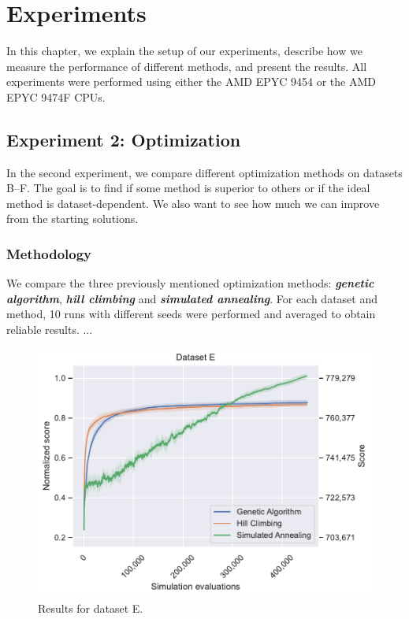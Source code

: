 \chapter{Experiments} \label{chap:experiments}

In this chapter, we explain the setup of our experiments, describe how we measure the performance of different methods, and present the results. All experiments were performed using either the AMD EPYC 9454 or the AMD EPYC 9474F CPUs.

\section{Experiment 2: Optimization}

In the second experiment, we compare different optimization methods on datasets B--F. The goal is to find if some method is superior to others or if the ideal method is dataset-dependent. We also want to see how much we can improve from the starting solutions.

\subsection*{Methodology}

We compare the three previously mentioned optimization methods: \textit{\textbf{genetic algorithm}}, \textit{\textbf{hill climbing}} and \textit{\textbf{simulated annealing}}. For each dataset and method, 10 runs with different seeds were performed and averaged to obtain reliable results. ...

\newpage

\begin{figure}[h]
    \centering
    \includegraphics[width=\linewidth]{img/experiments/e_Genetic Algorithm_Hill Climbing_Simulated Annealing.pdf}
    \caption[Results for dataset E]{
        Results for dataset E.
    }
    \label{fig:dataset_e_experiment}
\end{figure}

